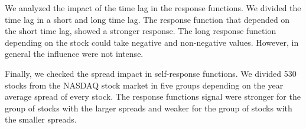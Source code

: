We analyzed the impact of the time lag in the response functions. We divided
the time lag in a short and long time lag. The response function that depended
on the short time lag, showed a stronger response. The long response function
depending on the stock could take negative and non-negative values. However, in
general the influence were not intense.

Finally, we checked the spread impact in self-response functions. We divided
530 stocks from the NASDAQ stock market in five groups depending on the year
average spread of every stock. The response functions signal were stronger for
the group of stocks with the larger spreads and weaker for the group of stocks
with the smaller spreads.